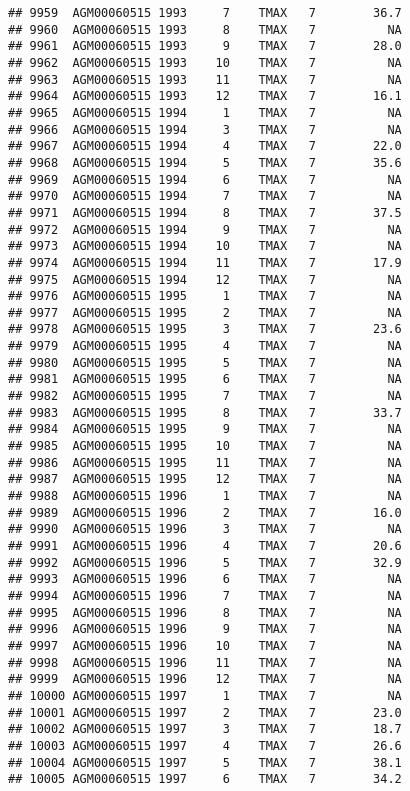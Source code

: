 \documentclass{article}\usepackage[]{graphicx}\usepackage[]{color}
\makeatletter
\newenvironment{kframe}{%
 \def\at@end@of@kframe{}%
 \ifinner\ifhmode%
  \def\at@end@of@kframe{\end{minipage}}%
  \begin{minipage}{\columnwidth}%
 \fi\fi%
 \def\FrameCommand##1{\hskip\@totalleftmargin \hskip-\fboxsep
 \colorbox{shadecolor}{##1}\hskip-\fboxsep
     \hskip-\linewidth \hskip-\@totalleftmargin \hskip\columnwidth}%
 \MakeFramed {\advance\hsize-\width
   \@totalleftmargin\z@ \linewidth\hsize
   \@setminipage}}%
 {\par\unskip\endMakeFramed%
 \at@end@of@kframe}
\newenvironment{knitrout}{}{} %
\makeatother
\begin{document}
\begin{knitrout}
\begin{kframe}
\begin{verbatim}
## 9959  AGM00060515 1993     7    TMAX   7        36.7
## 9960  AGM00060515 1993     8    TMAX   7          NA
## 9961  AGM00060515 1993     9    TMAX   7        28.0
## 9962  AGM00060515 1993    10    TMAX   7          NA
## 9963  AGM00060515 1993    11    TMAX   7          NA
## 9964  AGM00060515 1993    12    TMAX   7        16.1
## 9965  AGM00060515 1994     1    TMAX   7          NA
## 9966  AGM00060515 1994     3    TMAX   7          NA
## 9967  AGM00060515 1994     4    TMAX   7        22.0
## 9968  AGM00060515 1994     5    TMAX   7        35.6
## 9969  AGM00060515 1994     6    TMAX   7          NA
## 9970  AGM00060515 1994     7    TMAX   7          NA
## 9971  AGM00060515 1994     8    TMAX   7        37.5
## 9972  AGM00060515 1994     9    TMAX   7          NA
## 9973  AGM00060515 1994    10    TMAX   7          NA
## 9974  AGM00060515 1994    11    TMAX   7        17.9
## 9975  AGM00060515 1994    12    TMAX   7          NA
## 9976  AGM00060515 1995     1    TMAX   7          NA
## 9977  AGM00060515 1995     2    TMAX   7          NA
## 9978  AGM00060515 1995     3    TMAX   7        23.6
## 9979  AGM00060515 1995     4    TMAX   7          NA
## 9980  AGM00060515 1995     5    TMAX   7          NA
## 9981  AGM00060515 1995     6    TMAX   7          NA
## 9982  AGM00060515 1995     7    TMAX   7          NA
## 9983  AGM00060515 1995     8    TMAX   7        33.7
## 9984  AGM00060515 1995     9    TMAX   7          NA
## 9985  AGM00060515 1995    10    TMAX   7          NA
## 9986  AGM00060515 1995    11    TMAX   7          NA
## 9987  AGM00060515 1995    12    TMAX   7          NA
## 9988  AGM00060515 1996     1    TMAX   7          NA
## 9989  AGM00060515 1996     2    TMAX   7        16.0
## 9990  AGM00060515 1996     3    TMAX   7          NA
## 9991  AGM00060515 1996     4    TMAX   7        20.6
## 9992  AGM00060515 1996     5    TMAX   7        32.9
## 9993  AGM00060515 1996     6    TMAX   7          NA
## 9994  AGM00060515 1996     7    TMAX   7          NA
## 9995  AGM00060515 1996     8    TMAX   7          NA
## 9996  AGM00060515 1996     9    TMAX   7          NA
## 9997  AGM00060515 1996    10    TMAX   7          NA
## 9998  AGM00060515 1996    11    TMAX   7          NA
## 9999  AGM00060515 1996    12    TMAX   7          NA
## 10000 AGM00060515 1997     1    TMAX   7          NA
## 10001 AGM00060515 1997     2    TMAX   7        23.0
## 10002 AGM00060515 1997     3    TMAX   7        18.7
## 10003 AGM00060515 1997     4    TMAX   7        26.6
## 10004 AGM00060515 1997     5    TMAX   7        38.1
## 10005 AGM00060515 1997     6    TMAX   7        34.2

\end{verbatim}
\end{kframe}
\end{knitrout}
\end{document}
